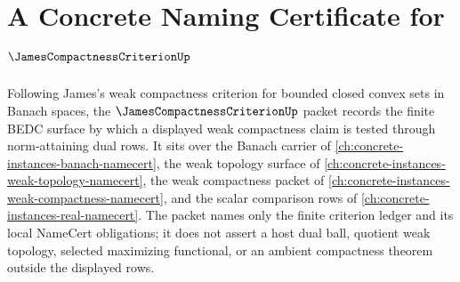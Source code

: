 \chapter{A Concrete Naming Certificate for $\JamesCompactnessCriterionUp$}
\label{ch:concrete-instances-james-compactness-criterion-namecert}

Following James's weak compactness criterion for bounded closed convex sets in Banach spaces, the $\JamesCompactnessCriterionUp$ packet records the finite BEDC surface by which a displayed weak compactness claim is tested through norm-attaining dual rows. It sits over the Banach carrier of \autoref{ch:concrete-instances-banach-namecert}, the weak topology surface of \autoref{ch:concrete-instances-weak-topology-namecert}, the weak compactness packet of \autoref{ch:concrete-instances-weak-compactness-namecert}, and the scalar comparison rows of \autoref{ch:concrete-instances-real-namecert}. The packet names only the finite criterion ledger and its local NameCert obligations; it does not assert a host dual ball, quotient weak topology, selected maximizing functional, or an ambient compactness theorem outside the displayed rows.

